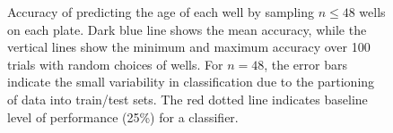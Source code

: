 \documentclass{article}\usepackage[]{graphicx}\usepackage[]{color}
\begin{document}
\begin{figure}
  \centering
  \caption{Accuracy of predicting the age of each well by sampling
    $n \leq 48$ wells on each plate. Dark blue line shows the mean
    accuracy, while the vertical lines show the minimum and maximum
    accuracy over 100 trials with random choices of wells.  For
    $n=48$, the error bars indicate the small variability in
    classification due to the partioning of data into train/test sets.
    The red dotted line indicates baseline level of performance (25\%)
    for a classifier.}
\end{figure}
\end{document}
